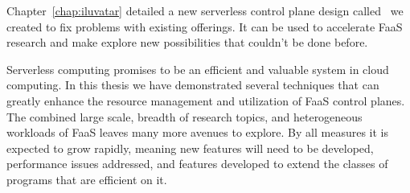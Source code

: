 Chapter~\ref{chap:iluvatar} detailed a new serverless control plane design called \sysname~we created to fix problems with existing offerings.
It can be used to accelerate FaaS research and make explore new possibilities that couldn't be done before.

Serverless computing promises to be an efficient and valuable system in cloud computing.
In this thesis we have demonstrated several techniques that can greatly enhance the resource management and utilization of FaaS control planes.
The combined large scale, breadth of research topics, and heterogeneous workloads of FaaS leaves many more avenues to explore.
By all measures it is expected to grow rapidly, meaning new features will need to be developed, performance issues addressed, and features developed to extend the classes of programs that are efficient on it.


